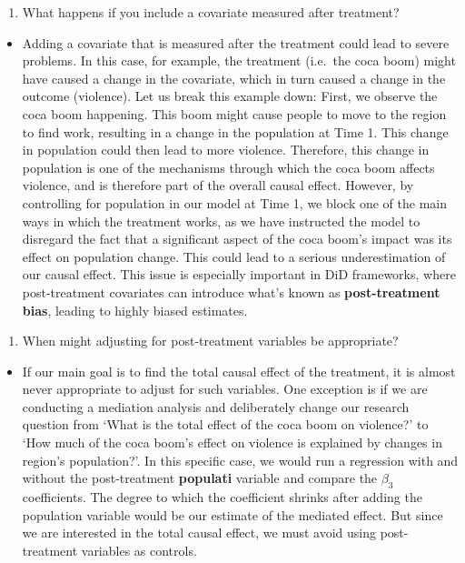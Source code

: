 \documentclass[
]{article}
\providecommand{\tightlist}{%
  \setlength{\itemsep}{0pt}\setlength{\parskip}{0pt}}
\begin{document}
\begin{enumerate}
\def\labelenumi{\arabic{enumi}.}
\setcounter{enumi}{1}
\tightlist
\item
  What happens if you include a covariate measured after treatment?
\end{enumerate}

\begin{itemize}
\tightlist
\item
  Adding a covariate that is measured after the treatment could lead to
  severe problems. In this case, for example, the treatment (i.e.~the
  coca boom) might have caused a change in the covariate, which in turn
  caused a change in the outcome (violence). Let us break this example
  down: First, we observe the coca boom happening. This boom might cause
  people to move to the region to find work, resulting in a change in
  the population at Time 1. This change in population could then lead to
  more violence. Therefore, this change in population is one of the
  mechanisms through which the coca boom affects violence, and is
  therefore part of the overall causal effect. However, by controlling
  for population in our model at Time 1, we block one of the main ways
  in which the treatment works, as we have instructed the model to
  disregard the fact that a significant aspect of the coca boom's impact
  was its effect on population change. This could lead to a serious
  underestimation of our causal effect. This issue is especially
  important in DiD frameworks, where post-treatment covariates can
  introduce what's known as \textbf{post-treatment bias}, leading to
  highly biased estimates.
\end{itemize}

\begin{enumerate}
\def\labelenumi{\arabic{enumi}.}
\setcounter{enumi}{2}
\tightlist
\item
  When might adjusting for post-treatment variables be appropriate?
\end{enumerate}

\begin{itemize}
\tightlist
\item
  If our main goal is to find the total causal effect of the treatment,
  it is almost never appropriate to adjust for such variables. One
  exception is if we are conducting a mediation analysis and
  deliberately change our research question from `What is the total
  effect of the coca boom on violence?' to `How much of the coca boom's
  effect on violence is explained by changes in region's population?'.
  In this specific case, we would run a regression with and without the
  post-treatment \textbf{populati} variable and compare the \(\beta_3\)
  coefficients. The degree to which the coefficient shrinks after adding
  the population variable would be our estimate of the mediated effect.
  But since we are interested in the total causal effect, we must avoid
  using post-treatment variables as controls.
\end{itemize}
\end{document}
